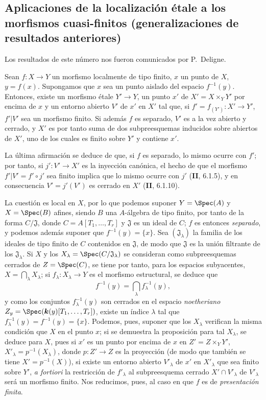 \subsection{Aplicaciones de la localización étale a los morfismos cuasi-finitos (generalizaciones de resultados anteriores)}
\label{subsection:IV.18.12}

Los resultados de este número nos fueron comunicados por P.~Deligne.

\begin{theorem}[18.12.1]
\label{IV.18.12.1}
Sean $f:X\to Y$ un morfismo localmente de tipo finito, $x$ un punto de $X$, $y=f(x)$. Supongamos que $x$ sea un punto aislado del espacio $f^{-1}(y)$. Entonces, existe un morfismo étale $Y'\to Y$, un punto $x'$ de $X'=X\times_Y Y'$ por encima de $x$ y un entorno abierto $V'$ de $x'$ en $X'$ tal que, si $f'=f_{(Y')}:X'\to Y'$, $f'|V'$ sea un morfismo finito. Si además $f$ es separado, $V'$ es a la vez abierto y cerrado, y $X'$ es por tanto suma de dos subpreesquemas inducidos sobre abiertos de $X'$, uno de los cuales es finito sobre $Y'$ y contiene $x'$.
\end{theorem}

La última afirmación se deduce de que, si $f$ es separado, lo mismo ocurre con $f'$; por tanto, si $j':V'\to X'$ es la inyección canónica, el hecho de que el morfismo $f'|V'=f'\circ j'$ sea finito implica que lo mismo ocurre con $j'$ (\textbf{II}, 6.1.5), y en consecuencia $V'=j'(V')$ es cerrado en $X'$ (\textbf{II}, 6.1.10).

La cuestión es local en $X$, por lo que podemos suponer $Y=\Spec(A)$ y $X=\Spec(B)$ afines, siendo $B$ una $A$-álgebra de tipo finito, por tanto de la forma $C/\mathfrak J$, donde $C=A[T_1,\ldots,T_r]$ y $\mathfrak J$ es un ideal de $C$; $f$ es entonces \emph{separado}, y podemos además suponer que $f^{-1}(y)=\{x\}$. Sea $(\mathfrak J_\lambda)$ la familia de los ideales de tipo finito de $C$ contenidos en $\mathfrak J$, de modo que $\mathfrak J$ es la unión filtrante de los $\mathfrak J_\lambda$. Si $X$ y los $X_\lambda=\Spec(C/\mathfrak J_\lambda)$ se consideran como subpreesquemas cerrados de $Z=\Spec(C)$, se tiene por tanto, para los espacios subyacentes, $X=\bigcap_\lambda X_\lambda$; si $f_\lambda:X_\lambda\to Y$ es el morfismo estructural, se deduce que
\[
  f^{-1}(y)=\bigcap_\lambda f_\lambda^{-1}(y),
\]
y como los conjuntos $f_\lambda^{-1}(y)$ son cerrados en el espacio \emph{noetheriano} $Z_y=\Spec(\boldsymbol k(y)[T_1,\ldots,T_r])$, existe un índice $\lambda$ tal que $f_\lambda^{-1}(y)=f^{-1}(y)=\{x\}$. Podemos, pues, suponer que los $X_\lambda$ verifican la misma condición que $X$ en el punto $x$; si se demuestra la proposición para tal $X_\lambda$, se deduce para $X$, pues si $x'$ es un punto por encima de $x$ en $Z'=Z\times_Y Y'$, $X'_\lambda=p^{-1}(X_\lambda)$, donde $p:Z'\to Z$ es la proyección (de modo que también se tiene $X'=p^{-1}(X)$), si existe un entorno abierto $V'_\lambda$ de $x'$ en $X'_\lambda$ que sea finito sobre $Y'$, \emph{a fortiori} la restricción de $f'_\lambda$ al subpreesquema cerrado $X'\cap V'_\lambda$ de $V'_\lambda$ será un morfismo finito. Nos reducimos, pues, al caso en que $f$ es de \emph{presentación finita}.

